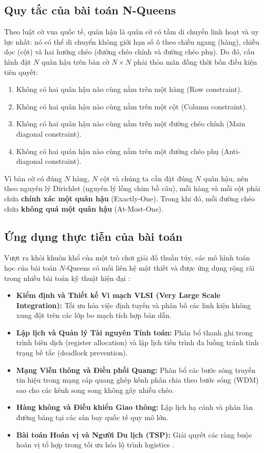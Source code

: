 \documentclass[a4paper,fleqn]{cas-sc}
\begin{document}
\subsection{Quy tắc của bài toán N-Queens}
\label{subsec:rules}
Theo luật cờ vua quốc tế, quân hậu là quân cờ có tầm di chuyển linh hoạt và uy lực nhất: nó có thể di chuyển không giới hạn số ô theo chiều ngang (hàng), chiều dọc (cột) và hai hướng chéo (đường chéo chính và đường chéo phụ). Do đó, cấu hình đặt $N$ quân hậu trên bàn cờ $N \times N$ phải thỏa mãn đồng thời bốn điều kiện tiên quyết:
\begin{enumerate}
    \item Không có hai quân hậu nào cùng nằm trên một hàng (Row constraint).
    \item Không có hai quân hậu nào cùng nằm trên một cột (Column constraint).
    \item Không có hai quân hậu nào cùng nằm trên một đường chéo chính (Main diagonal constraint).
    \item Không có hai quân hậu nào cùng nằm trên một đường chéo phụ (Anti-diagonal constraint).
\end{enumerate}

Vì bàn cờ có đúng $N$ hàng, $N$ cột và chúng ta cần đặt đúng $N$ quân hậu, nên theo nguyên lý Dirichlet (nguyên lý lồng chim bồ câu), mỗi hàng và mỗi cột phải chứa \textbf{chính xác một quân hậu} (Exactly-One). Trong khi đó, mỗi đường chéo chứa \textbf{không quá một quân hậu} (At-Most-One).

\subsection{Ứng dụng thực tiễn của bài toán}
\label{subsec:apps}
Vượt ra khỏi khuôn khổ của một trò chơi giải đố thuần túy, các mô hình toán học của bài toán $N$-Queens có mối liên hệ mật thiết và được ứng dụng rộng rãi trong nhiều bài toán kỹ thuật hiện đại \cite{sosic1994polynomial,erbas1992queens}:
\begin{itemize}
    \item \textbf{Kiểm định và Thiết kế Vi mạch VLSI (Very Large Scale Integration):} Tối ưu hóa việc định tuyến và phân bố các linh kiện không xung đột trên các lớp bo mạch tích hợp bán dẫn.
    \item \textbf{Lập lịch và Quản lý Tài nguyên Tính toán:} Phân bổ thanh ghi trong trình biên dịch (register allocation) và lập lịch tiến trình đa luồng tránh tình trạng bế tắc (deadlock prevention).
    \item \textbf{Mạng Viễn thông và Điều phối Quang:} Phân bổ các bước sóng truyền tín hiệu trong mạng cáp quang ghép kênh phân chia theo bước sóng (WDM) sao cho các kênh song song không gây nhiễu chéo.
    \item \textbf{Hàng không và Điều khiển Giao thông:} Lập lịch hạ cánh và phân làn đường băng tại các sân bay quốc tế quy mô lớn.
    \item \textbf{Bài toán Hoán vị và Người Du lịch (TSP):} Giải quyết các ràng buộc hoán vị tổ hợp trong tối ưu hóa lộ trình logistics \cite{hoffman2013traveling}.
\end{itemize}
\end{document}

